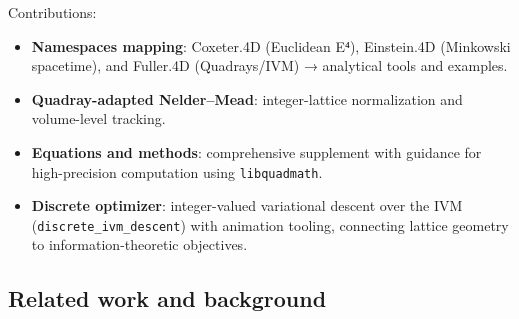 \documentclass[
  10pt,
]{article}
\providecommand{\tightlist}{%
  \setlength{\itemsep}{0pt}\setlength{\parskip}{0pt}}
\begin{document}
Contributions:

\begin{itemize}
\tightlist
\item
  \textbf{Namespaces mapping}: Coxeter.4D (Euclidean E⁴), Einstein.4D
  (Minkowski spacetime), and Fuller.4D (Quadrays/IVM) → analytical tools
  and examples.
\item
  \textbf{Quadray-adapted Nelder--Mead}: integer-lattice normalization
  and volume-level tracking.
\item
  \textbf{Equations and methods}: comprehensive supplement with guidance
  for high-precision computation using \texttt{libquadmath}.
\item
  \textbf{Discrete optimizer}: integer-valued variational descent over
  the IVM (\texttt{discrete\_ivm\_descent}) with animation tooling,
  connecting lattice geometry to information-theoretic objectives.
\end{itemize}

\hypertarget{related-work-and-background}{%
\subsection{Related work and
background}\label{related-work-and-background}}
\end{document}
